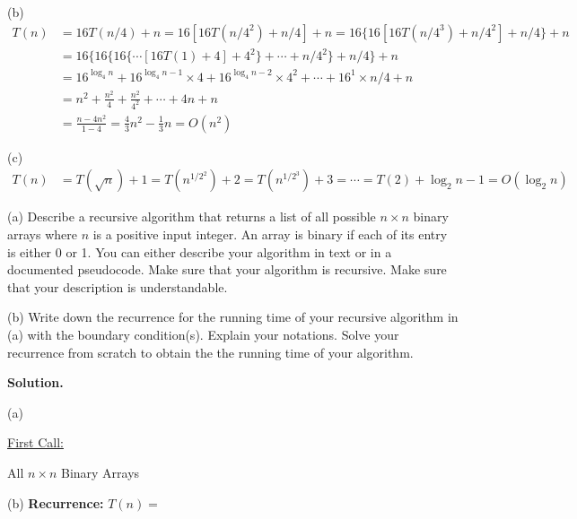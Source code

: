 \documentclass[10pt]{article}
\begin{document}
(b)
$$
\begin{aligned}
	T(n) &= 16T(n/4) + n = 16[16T(n/4^2) + n/4] + n = 16\{16[16T(n/4^3) + n/4^2] + n/4\} + n\\
	&= 16\{16\{16\{\cdots [16T(1) + 4] + 4^2\} + \cdots + n/4^2\} + n/4\} + n\\
	&= 16^{\log_4 n} + 16^{\log_4 n - 1} \times 4 + 16^{\log_4 n - 2} \times 4^2 + \cdots + 16^{1} \times n/4 + n\\
	&= n^2 + \frac{n^2}{4} + \frac{n^2}{4^2} + \cdots + 4n + n\\
	&= \frac{n-4n^2}{1-4} = \frac{4}{3} n^2 -\frac{1}{3} n = O(n^2)
\end{aligned}
$$

(c)
$$
\begin{aligned}
	T(n) &= T(\sqrt{n}) + 1 = T(n^{1/2^2}) + 2 = T(n^{1/2^3}) + 3 = \cdots = T(2) + \log_2 n - 1 = O(\log_2 n)
\end{aligned}
$$

\newpage

\begin{Problem}
	
	\noindent (a) Describe a recursive algorithm that returns a list of all possible $n\times n$ binary arrays where $n$ is a positive input integer. An array is binary if each of its entry is either 0 or 1. You can either describe your algorithm in text or in a documented pseudocode. Make sure that your algorithm is recursive. Make sure that your description is understandable.
	
	\noindent (b) Write down the recurrence for the running time of your
	recursive algorithm in (a) with the boundary condition(s). Explain your notations. Solve your recurrence from scratch to obtain the
	the running time of your algorithm.
	
\end{Problem}

\textbf{Solution.}

(a)
\begin{algorithm}
	\SetAlgoLined

	\underline{First Call:} 

	\caption{All $n\times n$ Binary Arrays}
\end{algorithm}

(b) \textbf{Recurrence:} $T(n) = $

\newpage
\end{document}

